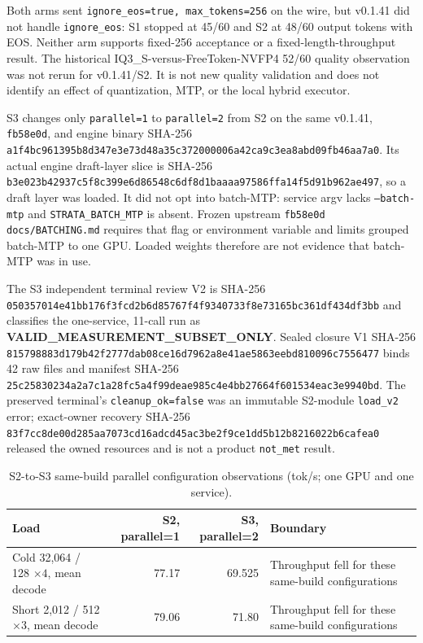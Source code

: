 \documentclass[11pt]{article}
\begin{document}
Both arms sent \texttt{ignore\_eos=true, max\_tokens=256} on the wire, but v0.1.41 did not handle \texttt{ignore\_eos}: S1 stopped at 45/60 and S2 at 48/60 output tokens with EOS. Neither arm supports fixed-256 acceptance or a fixed-length-throughput result. The historical IQ3\_S-versus-FreeToken-NVFP4 52/60 quality observation was not rerun for v0.1.41/S2. It is not new quality validation and does not identify an effect of quantization, MTP, or the local hybrid executor.

S3 changes only \texttt{parallel=1} to \texttt{parallel=2} from S2 on the same v0.1.41, \texttt{fb58e0d}, and engine binary SHA-256 \texttt{a1f4bc961395b8d347e3e73d48a35c372000006a42ca9c3ea8abd09fb46aa7a0}. Its actual engine draft-layer slice is SHA-256 \texttt{b3e023b42937c5f8c399e6d86548c6df8d1baaaa97586ffa14f5d91b962ae497}, so a draft layer was loaded. It did not opt into batch-MTP: service argv lacks \texttt{--batch-mtp} and \texttt{STRATA\_BATCH\_MTP} is absent. Frozen upstream \texttt{fb58e0d} \texttt{docs/BATCHING.md} requires that flag or environment variable and limits grouped batch-MTP to one GPU. Loaded weights therefore are not evidence that batch-MTP was in use.

The S3 independent terminal review V2 is SHA-256 \texttt{050357014e41bb176f3fcd2b6d85767f4f9340733f8e73165bc361df434df3bb} and classifies the one-service, 11-call run as \textbf{VALID\_MEASUREMENT\_SUBSET\_ONLY}. Sealed closure V1 SHA-256 \texttt{815798883d179b42f2777dab08ce16d7962a8e41ae5863eebd810096c7556477} binds 42 raw files and manifest SHA-256 \texttt{25c25830234a2a7c1a28fc5a4f99deae985c4e4bb27664f601534eac3e9940bd}. The preserved terminal's \texttt{cleanup\_ok=false} was an immutable S2-module \texttt{load\_v2} error; exact-owner recovery SHA-256 \texttt{83f7cc8de00d285aa7073cd16adcd45ac3be2f9ce1dd5b12b8216022b6cafea0} released the owned resources and is not a product \texttt{not\_met} result.

\begin{table}[t]
\centering
\scriptsize
\begin{tabular}{lrrl}
\toprule
Load & S2, parallel=1 & S3, parallel=2 & Boundary \\
\midrule
Cold 32,064 / 128 $\times4$, mean decode & 77.17 & 69.525 & Throughput fell for these same-build configurations \\
Short 2,012 / 512 $\times3$, mean decode & 79.06 & 71.80 & Throughput fell for these same-build configurations \\
\bottomrule
\end{tabular}
\caption{S2-to-S3 same-build parallel configuration observations (tok/s; one GPU and one service).}
\label{tab:strata-s3}
\end{table}
\end{document}
